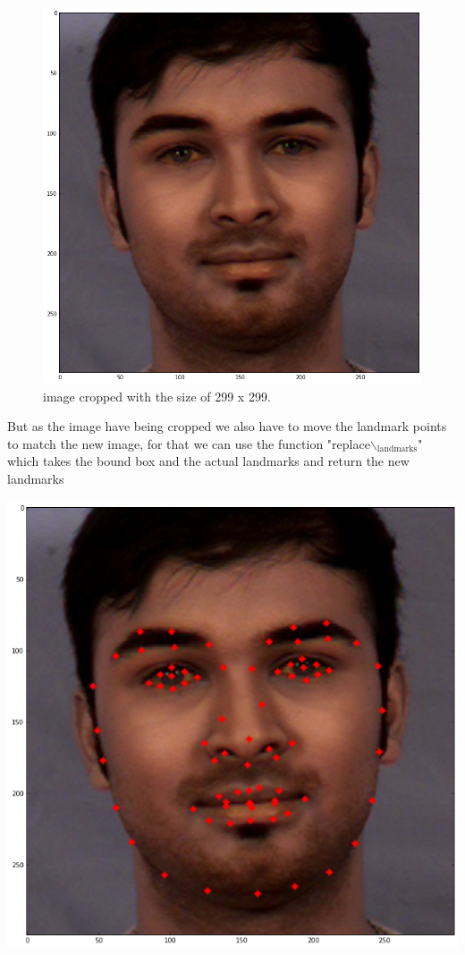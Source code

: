 \documentclass[11pt]{article}
\begin{document}
\begin{figure}[htbp]
\centering
\includegraphics[width=.9\linewidth]{./images/example3.png}
\caption{image cropped with the size of 299 x 299.}
\end{figure}

But as the image have being cropped we also have to move the landmark points
to match the new image, for that we can use the function "replace$\backslash$\(_{\text{landmarks}}\)"
which takes the bound box and the actual landmarks and return the new
landmarks

\begin{center}
\includegraphics[width=.9\linewidth]{./images/example4.png}
\end{center}
\end{document}
